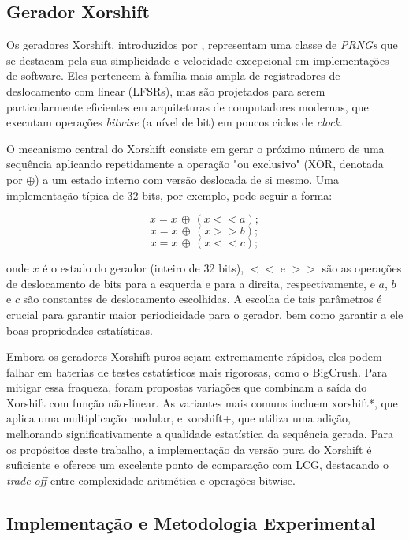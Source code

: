\documentclass[a4paper, 11pt]{article}
\begin{document}
\subsection{Gerador Xorshift}

Os geradores Xorshift, introduzidos por \cite{JSSv008i14}, representam uma classe de \textit{PRNGs} que se destacam pela sua simplicidade e velocidade excepcional em implementações de software. Eles pertencem à família mais ampla de registradores de deslocamento com linear (LFSRs), mas são projetados para serem particularmente eficientes em arquiteturas de computadores modernas, que executam operações \textit{bitwise} (a nível de bit) em poucos ciclos de \textit{clock}. \parencite{wikipedia_xorshift}

O mecanismo central do Xorshift consiste em gerar o próximo número de uma sequência aplicando repetidamente a operação "ou exclusivo" (XOR, denotada por $\oplus$) a um estado interno com versão deslocada de si mesmo. Uma implementação típica de 32 bits, por exemplo, pode seguir a forma:

$$x = x \,\oplus\, (x << a);$$
$$x = x \,\oplus\, (x >> b);$$
$$x = x \,\oplus\, (x << c);$$

\begin{flushleft}
    onde $x$ é o estado do gerador (inteiro de 32 bits), $<<$ e $>>$ são as operações de deslocamento de bits para a esquerda e para a direita, respectivamente, e $a$, $b$ e $c$ são constantes de deslocamento escolhidas. A escolha de tais parâmetros é crucial para garantir maior periodicidade para o gerador, bem como garantir a ele boas propriedades estatísticas.
\end{flushleft}

Embora os geradores Xorshift puros sejam extremamente rápidos, eles podem falhar em baterias de testes estatísticos mais rigorosas, como o BigCrush. Para mitigar essa fraqueza, foram propostas variações que combinam a saída do Xorshift com função não-linear. As variantes mais comuns incluem xorshift*, que aplica uma multiplicação modular, e xorshift+, que utiliza uma adição, melhorando significativamente a qualidade estatística da sequência gerada. Para os propósitos deste trabalho, a implementação da versão pura do Xorshift é suficiente e oferece um excelente ponto de comparação com LCG, destacando o \textit{trade-off} entre complexidade aritmética e operações bitwise. \parencite{vigna_xorshift_prng}

\subsection{Implementação e Metodologia Experimental}
\end{document}

